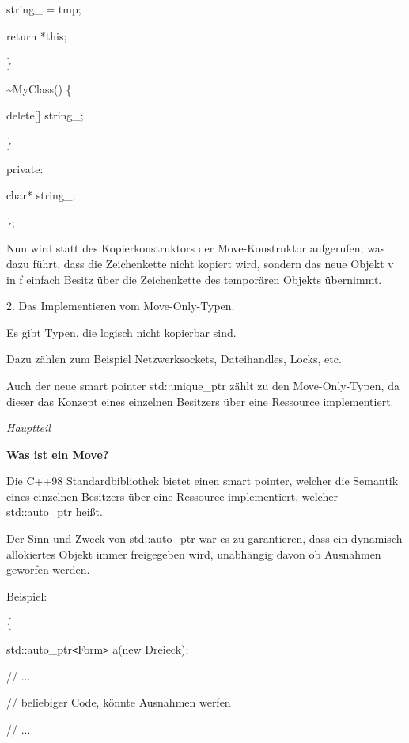\documentclass{article}
\begin{document}
\parindent=28pt
string\_ = tmp;        

return *this;    

\parindent=43pt
\}    

\vspace{12pt}
\parindent=14pt
\textasciitilde{}MyClass() \{        

\parindent=28pt
delete[] string\_;    

\parindent=14pt
\}

\vspace{12pt}
\parindent=0pt
private:    

\parindent=14pt
char* string\_;

\parindent=0pt
\};

\vspace{12pt}
Nun wird statt des Kopierkonstruktors der Move-Konstruktor aufgerufen, was dazu 
führt, dass die Zeichenkette nicht kopiert wird, sondern das neue Objekt v in 
f einfach Besitz über die Zeichenkette des temporären Objekts übernimmt.

\vspace{12pt}
2. Das Implementieren vom Move-Only-Typen.

Es gibt Typen, die logisch nicht kopierbar sind.

Dazu zählen zum Beispiel Netzwerksockets, Dateihandles, Locks, etc.

Auch der neue smart pointer std::unique\_ptr zählt zu den Move-Only-Typen, da 
dieser das Konzept eines einzelnen Besitzers über eine Ressource implementiert.

\vspace{25pt}
\emph{Hauptteil}

\textbf{Was ist ein Move?}

Die C++98 Standardbibliothek bietet einen smart pointer, welcher die Semantik eines 
einzelnen Besitzers über eine Ressource implementiert, welcher std::auto\_ptr 
heißt.

Der Sinn und Zweck von std::auto\_ptr war es zu garantieren, dass ein dynamisch 
allokiertes Objekt immer freigegeben wird, unabhängig davon ob Ausnahmen geworfen 
werden.

Beispiel:

\{    

\parindent=14pt
std::auto\_ptr\texttt{<}Form\texttt{>} a(new Dreieck);    

// ...    

\parindent=28pt
// beliebiger Code, könnte Ausnahmen werfen    

\parindent=14pt
// ... 
\end{document}
